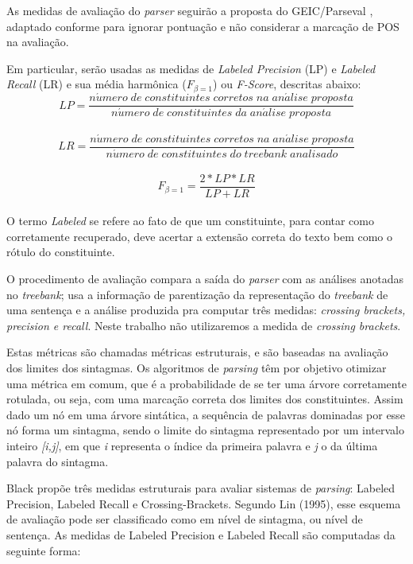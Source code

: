 As medidas de avaliação do \emph{parser} seguirão a proposta do GEIC/Parseval \cite{black91}, adaptado conforme \cite{collins97} para ignorar pontuação e não considerar a marcação de POS na avaliação. 

Em particular, serão usadas as medidas de \emph{Labeled Precision} (LP) e \emph{Labeled Recall} (LR) e sua média harmônica ($F_{\beta=1}$) ou \emph{F-Score}, descritas abaixo:
\\
$$LP = \frac{n\acute{u}mero\; de\; constituintes\; corretos\; na\; an\acute{a}lise\; proposta}{n\acute{u}mero\; de\; constituintes\; da\; an\acute{a}lise\; proposta}$$
\\
$$LR = \frac{n\acute{u}mero\; de\; constituintes\; corretos\; na\; an\acute{a}lise\; proposta}{n\acute{u}mero\; de\; constituintes\; do\; \mathit{treebank}\; analisado}$$
\\
$$F_{\beta=1} = \frac{2*LP*LR}{LP+LR}$$
\\
O termo \emph{Labeled} se refere ao fato de que um constituinte, para contar como corretamente recuperado, deve acertar a extensão correta do texto bem como o rótulo do constituinte.

O procedimento de avaliação compara a saída do \emph{parser} com as análises anotadas no \emph{treebank}; usa a informação de parentização da representação do \emph{treebank} de uma sentença e a análise produzida pra computar três medidas: \emph{crossing brackets, precision e recall}. Neste trabalho não utilizaremos a medida de \emph{crossing brackets}.

Estas métricas são chamadas métricas estruturais, e são baseadas na avaliação dos limites dos sintagmas. Os algoritmos de \emph{parsing} têm por objetivo otimizar uma métrica em comum, que é a probabilidade de se ter uma árvore corretamente rotulada, ou seja, com uma marcação correta dos limites dos constituintes. Assim dado um nó em uma árvore sintática, a sequência de palavras dominadas por esse nó forma um sintagma, sendo o limite do sintagma representado por um intervalo inteiro \emph{[i,j]}, em que \emph{i} representa o índice da primeira palavra e \emph{j} o da última palavra do sintagma.

Black \cite{black91} propõe três medidas estruturais para avaliar sistemas de \emph{parsing}: Labeled Precision, Labeled Recall e Crossing-Brackets. Segundo Lin (1995), esse esquema de avaliação pode ser classificado como em nível de sintagma, ou nível de sentença. 
As medidas de Labeled Precision e Labeled Recall são computadas da seguinte forma:


